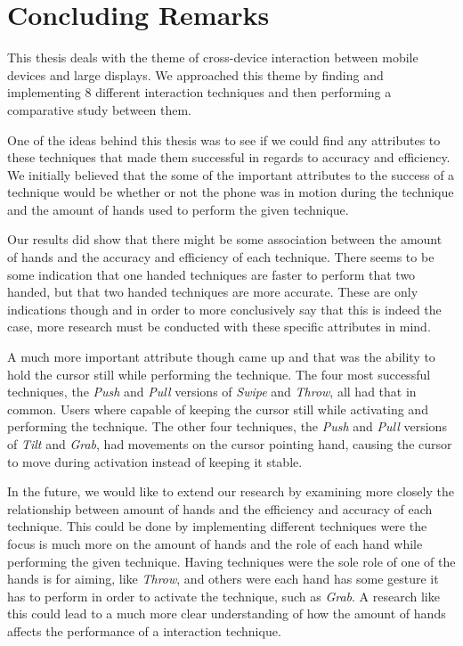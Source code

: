 \section*{Concluding Remarks} \label{sec:conclusion}

This thesis deals with the theme of cross-device interaction between mobile devices and large displays. 
We approached this theme by finding and implementing 8 different interaction techniques and then performing a comparative study between them.

One of the ideas behind this thesis was to see if we could find any attributes to these techniques that made them successful in regards to accuracy and efficiency.
We initially believed that the some of the important attributes to the success of a technique would be whether or not the phone was in motion during the technique and the amount of hands used to perform the given technique.

Our results did show that there might be some association between the amount of hands and the accuracy and efficiency of each technique. 
There seems to be some indication that one handed techniques are faster to perform that two handed, but that two handed techniques are more accurate.
These are only indications though and in order to more conclusively say that this is indeed the case, more research must be conducted with these specific attributes in mind.  

A much more important attribute though came up and that was the ability to hold the cursor still while performing the technique. 
The four most successful techniques, the \emph{Push} and \emph{Pull} versions of \emph{Swipe} and \emph{Throw}, all had that in common. 
Users where capable of keeping the cursor still while activating and performing the technique.
The other four techniques, the \emph{Push} and \emph{Pull} versions of \emph{Tilt} and \emph{Grab}, had movements on the cursor pointing hand, causing the cursor to move during activation instead of keeping it stable. 

In the future, we would like to extend our research by examining more closely the relationship between amount of hands and the efficiency and accuracy of each technique. 
This could be done by implementing different techniques were the focus is much more on the amount of hands and the role of each hand while performing the given technique.
Having techniques were the sole role of one of the hands is for aiming, like \emph{Throw}, and others were each hand has some gesture it has to perform in order to activate the technique, such as \emph{Grab}.
A research like this could lead to a much more clear understanding of how the amount of hands affects the performance of a interaction technique.